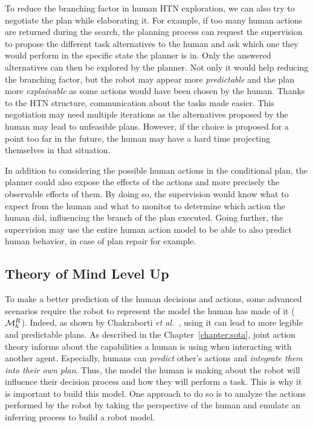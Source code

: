 \documentclass[a4paper,11pt,twoside]{StyleThese}
\begin{document}
To reduce the branching factor in human HTN exploration, we can also try to negotiate the plan while elaborating it. For example, if too many human actions are returned during the search, the planning process can request the supervision to propose the different task alternatives to the human and ask which one they would perform in the specific state the planner is in. Only the answered alternatives can then be explored by the planner. Not only it would help reducing the branching factor, but the robot may appear more \textit{predictable} and the plan more \textit{explainable} as some actions would have been chosen by the human. Thanks to the HTN structure, communication about the tasks made easier. This negotiation may need multiple iterations as the alternatives proposed by the human may lead to unfeasible plans. However, if the choice is proposed for a point too far in the future, the human may have a hard time projecting themselves in that situation.

In addition to considering the possible human actions in the conditional plan, the planner could also expose the effects of the actions and more precisely the observable effects of them. By doing so, the supervision would know what to expect from the human and what to monitor to determine which action the human did, influencing the branch of the plan executed. Going further, the supervision may use the entire human action model to be able to also predict human behavior, in case of plan repair for example.

\subsection*{Theory of Mind Level Up}
To make a better prediction of the human decisions and actions, some advanced scenarios require the robot to represent the model the human has made of it ($\mathcal{M}^R_h$). Indeed, as shown by Chakraborti \textit{et al.}~\cite{chakraborti2017plan}, using it can lead to more legible and predictable plans. As described in the Chapter~\ref{chapter:sota}, joint action theory informs about the capabilities a human is using when interacting with another agent. Especially, humans can \textit{predict} other's actions and \textit{integrate them into their own plan}. Thus, the model the human is making about the robot will influence their decision process and how they will perform a task. This is why it is important to build this model. One approach to do so is to analyze the actions performed by the robot by taking the perspective of the human and emulate an inferring process to build a robot model.
\end{document}
